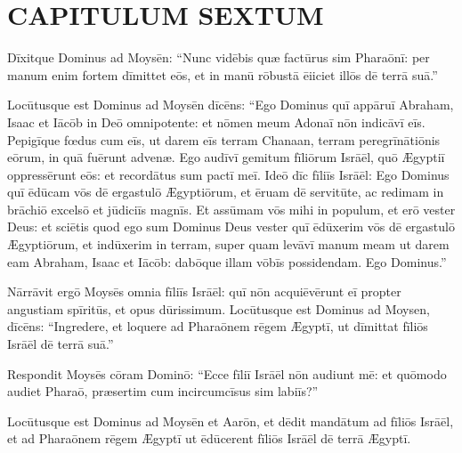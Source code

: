 \chapter{CAPITULUM SEXTUM}

Dīxitque Dominus ad Moysēn: ``Nunc vidēbis quæ factūrus
sim Pharaōnī: per manum enim fortem dīmittet
eōs, et in manū rōbustā ēiiciet illōs
dē terrā suā.''

Locūtusque est Dominus ad Moysēn dīcēns: ``Ego Dominus
quī appāruī Abraham, Isaac et Iācōb
in Deō omnipotente: et nōmen meum Adonaī
 nōn indicāvī eīs. Pepigīque fœdus cum eīs, ut
darem eīs terram Chanaan, terram peregrīnātiōnis
eōrum, in quā fuērunt advenæ. 
Ego audīvī gemitum fīliōrum Isrāēl, quō
Ægyptiī oppressērunt eōs: et recordātus
sum pactī meī. Ideō dīc fīliīs Isrāēl: Ego Dominus
quī ēdūcam vōs dē ergastulō Ægyptiōrum, et
ēruam dē servitūte, ac redimam in brāchiō
excelsō et jūdiciīs magnīs. Et assūmam vōs mihi
in populum, et erō vester Deus: et sciētis quod ego
sum Dominus Deus vester quī ēdūxerim vōs dē
ergastulō Ægyptiōrum, et indūxerim in terram, super quam
levāvī manum meam ut darem eam Abraham, Isaac
et Iācōb: dabōque illam vōbīs possidendam. 
Ego Dominus.''

Nārrāvit ergō Moysēs omnia fīliīs Isrāēl: quī nōn
acquiēvērunt eī
propter angustiam spīritūs, et opus dūrissimum. Locūtusque est
Dominus ad Moysen, dīcēns: ``Ingredere, et loquere ad Pharaōnem rēgem
Ægyptī, ut dīmittat fīliōs Isrāēl dē terrā suā.''

Respondit Moysēs cōram Dominō: ``Ecce fīliī Isrāēl nōn audiunt mē: et
quōmodo audiet
 Pharaō, præsertim cum incircumcīsus sim labiīs?'' 

Locūtusque est
Dominus ad Moysēn et Aarōn, et dēdit mandātum ad fīliōs Isrāēl, et ad
Pharaōnem rēgem Ægyptī ut ēdūcerent fīliōs Isrāēl dē terrā Ægyptī.

